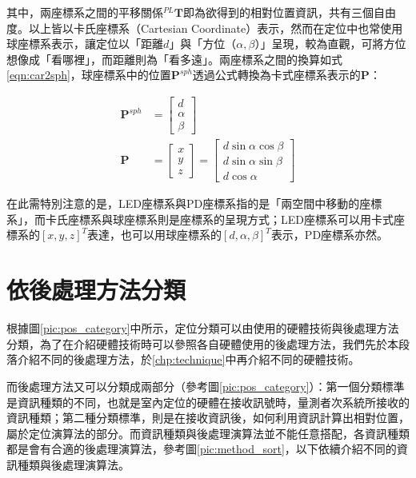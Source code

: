    
    
   其中，兩座標系之間的平移關係$^{PL}\boldsymbol{T}$即為欲得到的相對位置資訊，共有三個自由度。以上皆以卡氏座標系（Cartesian Coordinate）表示，然而在定位中也常使用球座標系表示，讓定位以「距離$d$」與「方位（$\alpha,\beta$）」呈現，較為直觀，可將方位想像成「看哪裡」，而距離則為「看多遠」。兩座標系之間的換算如式\ref{eqn:car2sph}，球座標系中的位置$\boldsymbol{P}^{sph}$透過公式轉換為卡式座標系表示的$\boldsymbol{P}$：

   \begin{equation}
    \label{eqn:car2sph}
        \begin{aligned}
        \boldsymbol{P}^{sph}&=\left[\begin{array}{c}
            d\\\alpha\\\beta
            \end{array}\right] \\  
        \boldsymbol{P} &= \left[\begin{array}{c}
            x\\y\\z
            \end{array}\right]=
            \left[\begin{array}{c}
            d\sin\alpha\cos\beta \\
            d\sin\alpha\sin\beta\\
            d\cos\alpha
            \end{array}\right] 
    \end{aligned}
   \end{equation}

   在此需特別注意的是，LED座標系與PD座標系指的是「兩空間中移動的座標系」，而卡氏座標系與球座標系則是座標系的呈現方式；LED座標系可以用卡式座標系的$[x,y,z]^T$表達，也可以用球座標系的$[d,\alpha,\beta]^T$表示，PD座標系亦然。



\section{依後處理方法分類}
\label{chp:method}

    
    根據圖\ref{pic:pos_category}中所示，定位分類可以由使用的硬體技術與後處理方法分類，為了在介紹硬體技術時可以參照各自硬體使用的後處理方法，我們先於本段落介紹不同的後處理方法，於\ref{chp:technique}中再介紹不同的硬體技術。

    而後處理方法又可以分類成兩部分（參考圖\ref{pic:pos_category}）：第一個分類標準是資訊種類的不同，也就是室內定位的硬體在接收訊號時，量測者次系統所接收的資訊種類；第二種分類標準，則是在接收資訊後，如何利用資訊計算出相對位置，屬於定位演算法的部分。而資訊種類與後處理演算法並不能任意搭配，各資訊種類都是會有合適的後處理演算法，參考圖\ref{pic:method_sort}，以下依續介紹不同的資訊種類與後處理演算法。


